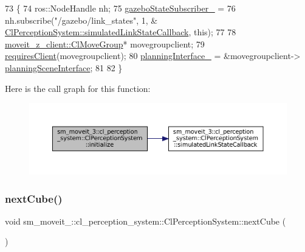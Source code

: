 \begin{DoxyCode}
73   \{
74     ros::NodeHandle nh;
75     \hyperlink{classsm__moveit__3_1_1cl__perception__system_1_1ClPerceptionSystem_a66371d7b71709d9286e63ee92f6507c5}{gazeboStateSubscriber\_} =
76         nh.subscribe(\textcolor{stringliteral}{"/gazebo/link\_states"}, 1, &
      \hyperlink{classsm__moveit__3_1_1cl__perception__system_1_1ClPerceptionSystem_a540c3a50c29e6ec58f6fcd7e993d9dff}{ClPerceptionSystem::simulatedLinkStateCallback}, \textcolor{keyword}{this});
77     
78     \hyperlink{classmoveit__z__client_1_1ClMoveGroup}{moveit\_z\_client::ClMoveGroup}* movegroupclient;
79     \hyperlink{classsmacc_1_1ISmaccClient_a7a9990a2f3e35d547671188d69fee520}{requiresClient}(movegroupclient);
80     \hyperlink{classsm__moveit__3_1_1cl__perception__system_1_1ClPerceptionSystem_aa59191e3993ffbfc8e8332f76d727259}{planningInterface\_} = &movegroupclient->
      \hyperlink{classmoveit__z__client_1_1ClMoveGroup_a21c879b2683286aa21ce68f40195b4b5}{planningSceneInterface};
81 
82   \}
\end{DoxyCode}
Here is the call graph for this function\+:
\nopagebreak
\begin{figure}[H]
\begin{center}
\leavevmode
\includegraphics[width=350pt]{classsm__moveit__3_1_1cl__perception__system_1_1ClPerceptionSystem_a852bf07fda7da87e7bb4ad9336e25042_cgraph}
\end{center}
\end{figure}
\mbox{\label{classsm__moveit__3_1_1cl__perception__system_1_1ClPerceptionSystem_a35d80131bec4a63ab939667865e7d08d}} 
\subsubsection{\texorpdfstring{next\+Cube()}{nextCube()}}
{\footnotesize\ttfamily void sm\+\_\+moveit\+\_\+::cl\+\_\+perception\+\_\+system\+::\+Cl\+Perception\+System\+::next\+Cube (\begin{DoxyParamCaption}{ }\end{DoxyParamCaption})\hspace{0.3cm}{\ttfamily [inline]}}



